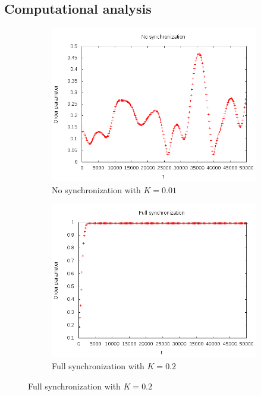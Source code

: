 \documentclass[12pt]{article}
\begin{document}
\subsection{Computational analysis}
\begin{figure}
\centering
\begin{subfigure}[b]{0.4\textwidth}
\centering
\includegraphics[width=\textwidth]{data/strange}
\caption{No synchronization with $K=0.01$}
\label{fig:plot:nosynchro}
\end{subfigure}
\begin{subfigure}[b]{0.4\textwidth}
\centering
\includegraphics[width=\textwidth]{data/full}
\caption{Full synchronization with $K=0.2$}
\label{fig:plot:full}
\end{subfigure}

\end{figure}
\end{document}
